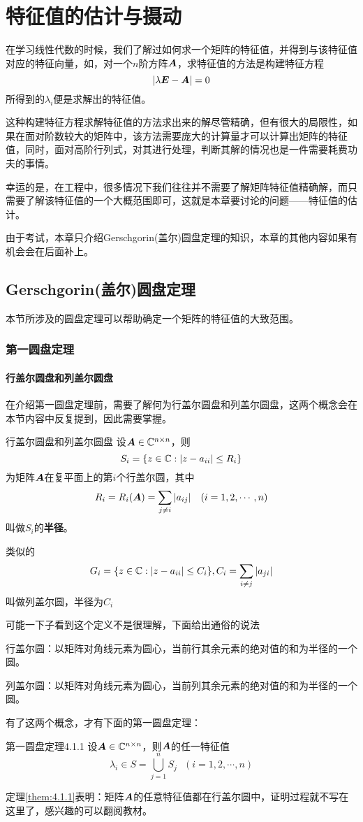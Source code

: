 \documentclass[12pt, a4paper, oneside, UTF8]{ctexbook}
\begin{document}
\else
\fi
\chapter{特征值的估计与摄动}
在学习线性代数的时候，我们了解过如何求一个矩阵的特征值，并得到与该特征值对应的特征向量，如，对一个$n$阶方阵$\boldsymbol{A}$，求特征值的方法是构建特征方程\[|\lambda\boldsymbol{E}-\boldsymbol{A}|=0\]所得到的$\lambda_i$便是求解出的特征值。

这种构建特征方程求解特征值的方法求出来的解尽管精确，但有很大的局限性，如果在面对阶数较大的矩阵中，该方法需要庞大的计算量才可以计算出矩阵的特征值，同时，面对高阶行列式，对其进行处理，判断其解的情况也是一件需要耗费功夫的事情。

幸运的是，在工程中，很多情况下我们往往并不需要了解矩阵特征值精确解，而只需要了解该特征值的一个大概范围即可，这就是本章要讨论的问题——特征值的估计。

由于考试，本章只介绍Gerschgorin(盖尔)圆盘定理的知识，本章的其他内容如果有机会会在后面补上。
\newpage
\section{Gerschgorin(盖尔)圆盘定理}
本节所涉及的圆盘定理可以帮助确定一个矩阵的特征值的大致范围。
\subsection{第一圆盘定理}
\subsubsection{行盖尔圆盘和列盖尔圆盘}
在介绍第一圆盘定理前，需要了解何为行盖尔圆盘和列盖尔圆盘，这两个概念会在本节内容中反复提到，因此需要掌握。
\begin{defn}{行盖尔圆盘和列盖尔圆盘}{}
    设$\boldsymbol{A}\in\mathbb{C}^{n\times n}$，则
    \[S_i=\{z\in\mathbb{C}:|z-a_{ii}|\leq R_i\}\]为矩阵$\boldsymbol{A}$在复平面上的第$i$个行盖尔圆，其中\[R_i=R_i(\A)=\sum_{j\neq i}|a_{ij}|\ \ \ (i=1,2,\cdots,n)\]叫做$S_i$的\textbf{半径}。

    类似的\[G_i=\{z\in\mathbb{C}:|z-a_{ii}|\leq C_i\}, C_i=\sum_{i\neq j}|a_{ji}|\]叫做列盖尔圆，半径为$C_i$
\end{defn}

可能一下子看到这个定义不是很理解，下面给出通俗的说法

行盖尔圆：以矩阵对角线元素为圆心，当前行其余元素的绝对值的和为半径的一个圆。

列盖尔圆：以矩阵对角线元素为圆心，当前列其余元素的绝对值的和为半径的一个圆。

有了这两个概念，才有下面的第一圆盘定理：
\begin{them}{第一圆盘定理}{4.1.1}
    设$\boldsymbol{A}\in\mathbb{C}^{n\times n}$，则$\boldsymbol{A}$的任一特征值\[\lambda_i\in S=\bigcup_{j=1}^n S_j\ \ \ (i=1,2,\cdots, n)\]
\end{them}
定理\ref{them:4.1.1}表明：矩阵$\boldsymbol{A}$的任意特征值都在行盖尔圆中，证明过程就不写在这里了，感兴趣的可以翻阅教材。
\end{document}
